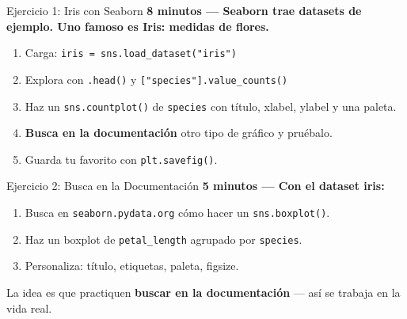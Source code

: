 \documentclass[aspectratio=169, 11pt]{beamer}
\begin{document}
\begin{frame}[shrink=5]{Ejercicio 1: Iris con Seaborn}
  \vspace{-4pt}
  {\footnotesize\color{arcaDark}\bfseries
    \faClock\hspace{4pt} 8 minutos --- Seaborn trae datasets de
    ejemplo. Uno famoso es \textbf{Iris}: medidas de flores.}

  \vspace{6pt}
  {\footnotesize
  \begin{enumerate}\setlength{\itemsep}{4pt}
    \item Carga: \texttt{iris = sns.load\_dataset("iris")}
    \item Explora con \texttt{.head()} y
      \texttt{["species"].value\_counts()}
    \item Haz un \texttt{sns.countplot()} de \texttt{species}
      con título, xlabel, ylabel y una paleta.
    \item \textbf{Busca en la documentación} otro tipo de
      gráfico y pruébalo.
    \item Guarda tu favorito con \texttt{plt.savefig()}.
  \end{enumerate}
  }
\end{frame}

\begin{frame}[shrink=5]{Ejercicio 2: Busca en la Documentación}
  \vspace{-4pt}
  {\footnotesize\color{arcaDark}\bfseries
    \faClock\hspace{4pt} 5 minutos --- Con el dataset iris:}

  \vspace{6pt}
  {\footnotesize
  \begin{enumerate}\setlength{\itemsep}{5pt}
    \item Busca en \texttt{seaborn.pydata.org} cómo hacer
      un \texttt{sns.boxplot()}.
    \item Haz un boxplot de \texttt{petal\_length} agrupado
      por \texttt{species}.
    \item Personaliza: título, etiquetas, paleta, figsize.
  \end{enumerate}
  }

  \vspace{6pt}
  {\scriptsize\color{textMuted}
    La idea es que practiquen \textbf{buscar en la
    documentación} --- así se trabaja en la vida real.}
\end{frame}
\end{document}
